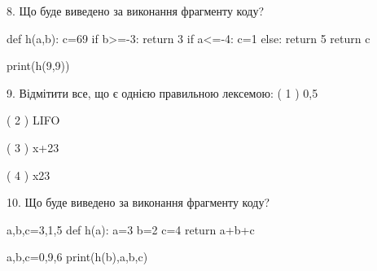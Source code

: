 \documentclass[11pt]{article}
\begin{document}
8. Що буде виведено за виконання фрагменту коду?

def h(a,b):
    c=69
    if b>=-3:
        return 3
    if a<=-4:
         c=1
    else: 
        return 5
    return c

print(h(9,9))
\vspace{5mm}

9. %
Відмітити все, що є однією правильною лексемою:
( 1 ) 0,5

( 2 ) LIFO

( 3 ) x+23

( 4 ) x23
\vspace{5mm}

10. Що буде виведено за виконання фрагменту коду?

a,b,c=3,1,5
def h(a):
    a=3
    b=2
    c=4
    return a+b+c

a,b,c=0,9,6
print(h(b),a,b,c)
\vspace{5mm}

\newpage
\end{document}
